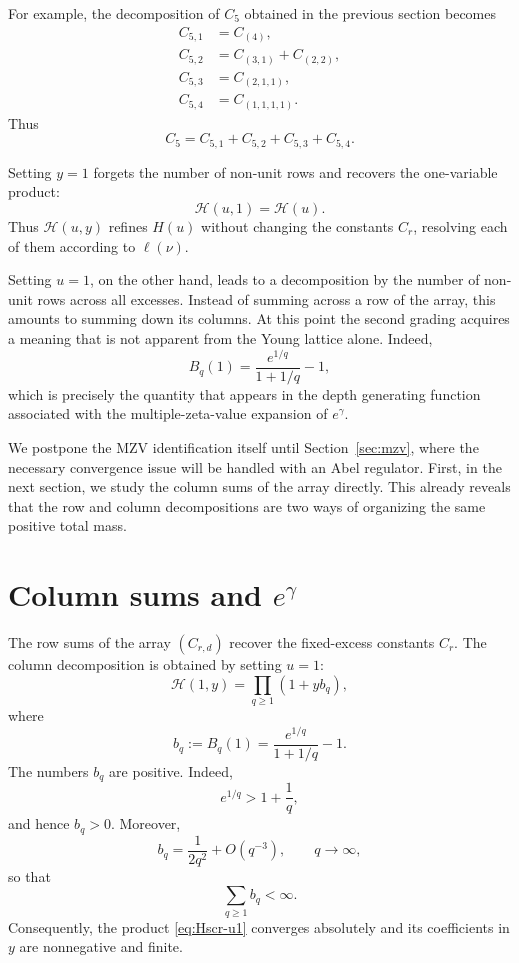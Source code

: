 \documentclass[11pt]{article}
\theoremstyle{definition}
\begin{document}
For example, the decomposition of $C_5$ obtained in the previous
section becomes
\[
\begin{aligned}
 C_{5,1}
   &=C_{(4)},\\
 C_{5,2}
   &=C_{(3,1)}+C_{(2,2)},\\
 C_{5,3}
   &=C_{(2,1,1)},\\
 C_{5,4}
   &=C_{(1,1,1,1)}.
\end{aligned}
\]
Thus
\[
        C_5
        =
        C_{5,1}+C_{5,2}+C_{5,3}+C_{5,4}.
\]

Setting $y=1$ forgets the number of non-unit rows and recovers the
one-variable product:
\[
        \mathscr H(u,1)=\mathcal H(u).
\]
Thus $\mathscr H(u,y)$ refines $H(u)$ without changing the
constants $C_r$, resolving each of them according to $\ell(\nu)$.

Setting $u=1$, on the other hand, leads to a decomposition by the
number of non-unit rows across all excesses.
Instead of summing across a row of the array, this
amounts to summing down its columns.  At this point the second
grading acquires a meaning that is not apparent from the Young
lattice alone.  Indeed,
\[
 B_q(1)
 =
 \frac{e^{1/q}}{1+1/q}-1,
\]
which is precisely the quantity that appears in the depth generating
function associated with the multiple-zeta-value expansion of
$e^\gamma$.

We postpone the MZV identification itself until
Section~\ref{sec:mzv}, where the necessary convergence issue will be
handled with an Abel regulator.  First, in the next section, we study
the column sums of the array directly.  This already reveals that
the row and column decompositions are two ways of organizing the
same positive total mass.

\section{Column sums and $e^\gamma$}
\label{sec:columns}

The row sums of the array $(C_{r,d})$ recover the fixed-excess
constants $C_r$.  The column decomposition is obtained by setting $u=1$:
\begin{equation}
\mathscr H(1,y)
=
\prod_{q\geq1}(1+yb_q),
\label{eq:Hscr-u1}
\end{equation}
where
\begin{equation}
b_q:=B_q(1)
=
\frac{e^{1/q}}{1+1/q}-1.
\label{eq:bq}
\end{equation}
The numbers $b_q$ are positive.  Indeed,
\[
        e^{1/q}>1+\frac1q,
\]
and hence $b_q>0$.  Moreover,
\[
        b_q
        =
        \frac{1}{2q^2}+O(q^{-3}),
        \qquad q\to\infty,
\]
so that
\[
        \sum_{q\geq1}b_q<\infty.
\]
Consequently, the product \eqref{eq:Hscr-u1} converges absolutely
and its coefficients in $y$ are nonnegative and finite.
\end{document}

